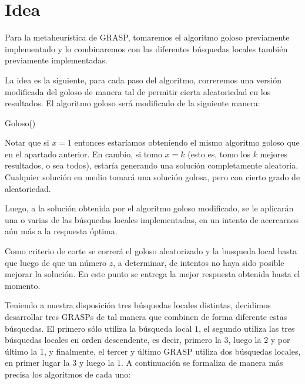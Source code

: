 \section{Idea}


Para la metaheurística de GRASP, tomaremos el algoritmo goloso previamente implementado y lo combinaremos con las diferentes búsquedas locales también previamente implementadas.

La idea es la siguiente, para cada paso del algoritmo, correremos una versión modificada del goloso de manera tal de permitir cierta aleatoriedad en los resultados. El algoritmo goloso será modificado de la siguiente manera:

\begin{algorithm}
  \begin{algorithmic}[1]\parskip=1mm
 \caption{ Goloso()}
\end{algorithmic}
\end{algorithm} 

Notar que si $x=1$ entonces estaríamos obteniendo el mismo algoritmo goloso que en el apartado anterior. En cambio, si tomo $x = k$ (esto es, tomo los $k$ mejores resultados, o sea todos), estaría generando una solución completamente aleatoria. Cualquier solución en medio tomará una solución golosa, pero con cierto grado de aleatoriedad.

Luego, a la solución obtenida por el algoritmo goloso modificado, se le aplicarán una o varias de las búsquedas locales implementadas, en un intento de acercarnos aún más a la respuesta óptima.

Como criterio de corte se correrá el goloso aleatorizado y la busqueda local hasta que luego de que un número $z$, a determinar, de intentos no haya sido posible mejorar la solución. En este punto se entrega la mejor respuesta obtenida hasta el momento.

Teniendo a nuestra disposición tres búsquedas locales distintas, decidimos desarrollar tres GRASPs de tal manera que combinen de forma diferente estas búsquedas. El primero sólo utiliza la búsqueda local $1$, el segundo utiliza las tres búsquedas locales en orden descendente, es decir, primero la $3$, luego la $2$ y por último la $1$, y finalmente, el tercer y último GRASP utiliza dos búsquedas locales, en primer lugar la $3$ y luego la $1$. A continuación se formaliza de manera más precisa los algoritmos de cada uno:


